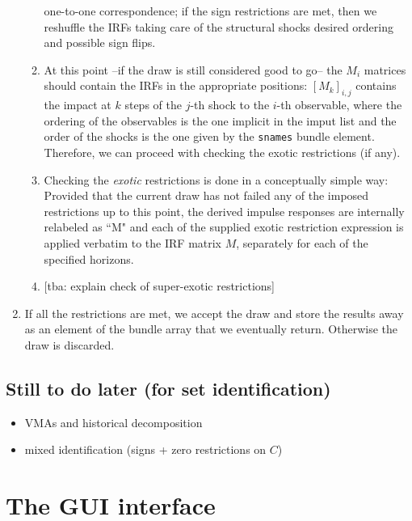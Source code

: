 \documentclass[a4paper,10pt]{article}
\begin{document}
\begin{enumerate}
\begin{enumerate}
      one-to-one correspondence; if the sign restrictions are met,
      then we reshuffle the IRFs taking care of the structural shocks
      desired ordering and possible sign flips. 
    \item At this point --if the draw is still considered good to go-- the 
      $M_i$ matrices should contain the IRFs in
      the appropriate positions: $[M_k]_{i,j}$ contains the impact at
      $k$ steps of the $j$-th shock to the $i$-th observable, where
      the ordering of the observables is the one implicit in the imput
      list and the order of the shocks is the one given by the
      \texttt{snames} bundle element. Therefore, we can proceed with
      checking the exotic restrictions (if any).
    \item Checking the \emph{exotic} restrictions is done in a conceptually
      simple way: Provided that the current draw has not failed any of the 
      imposed restrictions up to this point, the derived impulse responses are 
      internally relabeled as ``M" and each of the supplied exotic restriction 
      expression is applied
      verbatim to the IRF matrix $M$, separately for each of the specified horizons.
    \item{} [tba: explain check of super-exotic restrictions]  
      
    \end{enumerate}
  \item If all the restrictions are met, we accept the draw and store the
    results away as an element of the bundle array that we eventually
    return. Otherwise the draw is discarded.
\end{enumerate}

\subsection{Still to do later (for set identification)}

\begin{itemize}
\item VMAs and historical decomposition
\item mixed identification (signs + zero restrictions on $C$)
\end{itemize}





\appendix

\pagebreak

\section{The GUI interface}
\label{sec:GUI}
\end{document}
